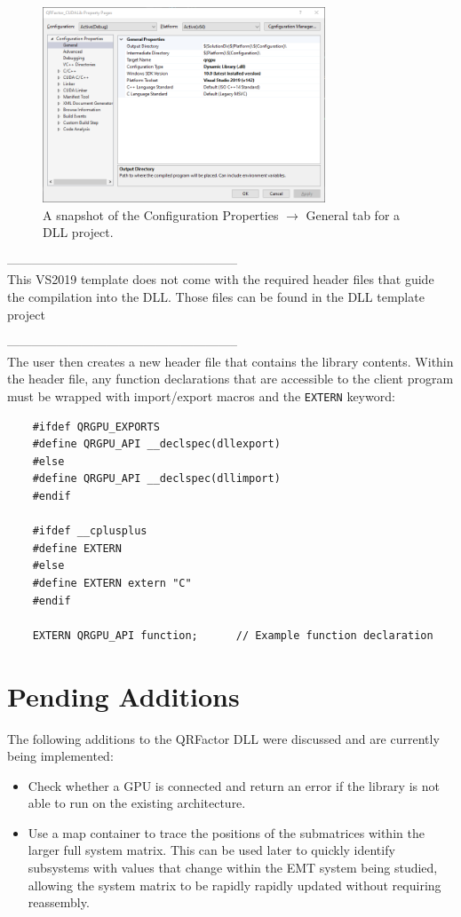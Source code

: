 \documentclass[11pt,letterpaper]{article}
\begin{document}
\begin{figure}[h]
    \centering
    \includegraphics[width=0.75\textwidth]{DLL_GeneralProperties.png}
    \caption{A snapshot of the Configuration Properties $\to$ General tab for a DLL project.}
    \label{fig: gen props}
\end{figure}

--------------------------------------------------------\\

This VS2019 template does not come with the required header files that guide the compilation into the DLL. Those files can be found in the DLL template project

--------------------------------------------------------\\

The user then creates a new header file that contains the library contents. Within the header file, any function declarations that are accessible to the client program must be wrapped with import/export macros and the \verb+EXTERN+ keyword:
\begin{verbatim}
    #ifdef QRGPU_EXPORTS
    #define QRGPU_API __declspec(dllexport)
    #else
    #define QRGPU_API __declspec(dllimport)
    #endif

    #ifdef __cplusplus			
    #define EXTERN
    #else
    #define EXTERN extern "C"
    #endif

    EXTERN QRGPU_API function;      // Example function declaration
\end{verbatim}


\section{Pending Additions}
\label{sec: additions}
The following additions to the QRFactor DLL were discussed and are currently being implemented:
\begin{itemize}
    \item Check whether a GPU is connected and return an error if the library is not able to run on the existing architecture.
    \item Use a map container to trace the positions of the submatrices within the larger full system matrix. This can be used later to quickly identify subsystems with values that change within the EMT system being studied, allowing the system matrix to be rapidly rapidly updated without requiring reassembly.
\end{itemize}


\end{document}
